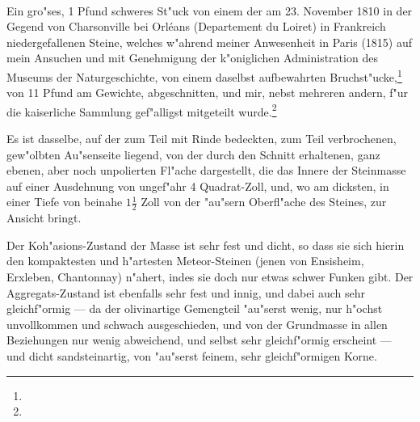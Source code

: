 \documentclass[a4paper, 11pt, oneside, german]{article}
\begin{document}
\paragraph{}
Ein gro"ses, 1 Pfund schweres St"uck von einem der am 23. November 1810 in der Gegend von Charsonville bei Orléans (Departement du Loiret) in Frankreich niedergefallenen Steine, welches w"ahrend meiner Anwesenheit in Paris (1815) auf mein Ansuchen und mit Genehmigung der k"oniglichen Administration des Museums der Naturgeschichte, von einem daselbst aufbewahrten Bruchst"ucke,\footnote{} von 11 Pfund am Gewichte, abgeschnitten, und mir, nebst mehreren andern, f"ur die kaiserliche Sammlung gef"alligst mitgeteilt wurde.\footnote{}

Es ist dasselbe, auf der zum Teil mit Rinde bedeckten, zum Teil verbrochenen, gew"olbten Au"senseite liegend, von der durch den Schnitt erhaltenen, ganz ebenen, aber noch unpolierten Fl"ache dargestellt, die das Innere der Steinmasse auf einer Ausdehnung von ungef"ahr 4 Quadrat-Zoll, und, wo am dicksten, in einer Tiefe von beinahe $1\frac{1}{2}$ Zoll von der "au"sern Oberfl"ache des Steines, zur Ansicht bringt.

Der Koh"asions-Zustand der Masse ist sehr fest und dicht, so dass sie sich hierin den kompaktesten und h"artesten Meteor-Steinen (jenen von Ensisheim, Erxleben, Chantonnay) n"ahert, indes sie doch nur etwas schwer Funken gibt. Der Aggregats-Zustand ist ebenfalls sehr fest und innig, und dabei auch sehr gleichf"ormig --- da der olivinartige Gemengteil "au"serst wenig, nur h"ochst unvollkommen und schwach ausgeschieden, und von der Grundmasse in allen Beziehungen nur wenig abweichend, und selbst sehr gleichf"ormig erscheint --- und dicht sandsteinartig, von "au"serst feinem, sehr gleichf"ormigen Korne.
\end{document}
